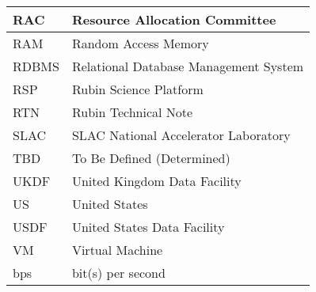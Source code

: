 \begin{longtable}{p{}p{}}
RAC & Resource Allocation Committee \\\hline
RAM & Random Access Memory \\\hline
RDBMS & Relational Database Management System  \\\hline
RSP & Rubin Science Platform \\\hline
RTN & Rubin Technical Note \\\hline
SLAC & SLAC National Accelerator Laboratory \\\hline
TBD & To Be Defined (Determined) \\\hline
UKDF & United Kingdom Data Facility \\\hline
US & United States \\\hline
USDF & United States Data Facility \\\hline
VM & Virtual Machine \\\hline
bps & bit(s) per second \\\hline
\end{longtable}
